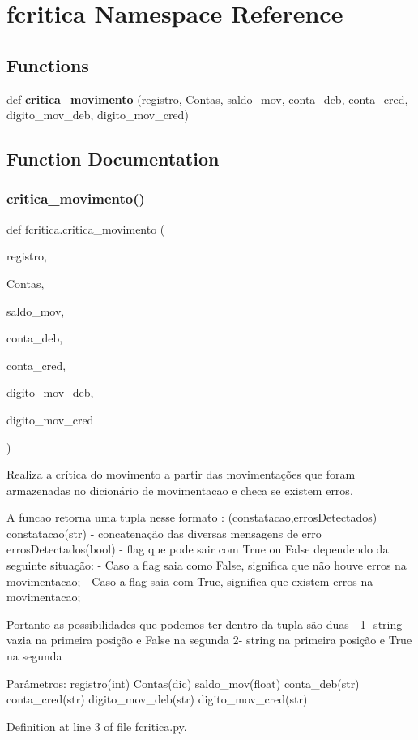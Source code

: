 \section{fcritica Namespace Reference}
\label{namespacefcritica}
\subsection*{Functions}
\begin{DoxyCompactItemize}
\item 
def \textbf{ critica\+\_\+movimento} (registro, Contas, saldo\+\_\+mov, conta\+\_\+deb, conta\+\_\+cred, digito\+\_\+mov\+\_\+deb, digito\+\_\+mov\+\_\+cred)
\end{DoxyCompactItemize}


\subsection{Function Documentation}
\mbox{\label{namespacefcritica_a964cf08203c12f5247facd77732b2154}} 
\subsubsection{critica\_movimento()}
{\footnotesize\ttfamily def fcritica.\+critica\+\_\+movimento (\begin{DoxyParamCaption}\item[{}]{registro,  }\item[{}]{Contas,  }\item[{}]{saldo\+\_\+mov,  }\item[{}]{conta\+\_\+deb,  }\item[{}]{conta\+\_\+cred,  }\item[{}]{digito\+\_\+mov\+\_\+deb,  }\item[{}]{digito\+\_\+mov\+\_\+cred }\end{DoxyParamCaption})}

\begin{DoxyVerb}Realiza a crítica do movimento a partir das movimentações que foram armazenadas
no dicionário de movimentacao e checa se existem erros.

A funcao retorna uma tupla nesse formato : (constatacao,errosDetectados)
constatacao(str) - concatenação das diversas mensagens de erro
errosDetectados(bool) - flag que pode sair com True ou False dependendo
da seguinte situação:
- Caso a flag saia como False, significa que não houve erros na movimentacao;
- Caso a flag saia com True, significa que existem erros na movimentacao;

Portanto as possibilidades que podemos ter dentro da tupla são duas -
1- string vazia na primeira posição e False na segunda
2- string na primeira posição e True na segunda

Parâmetros:
registro(int)
Contas(dic)
saldo_mov(float)
conta_deb(str)
conta_cred(str)
digito_mov_deb(str)
digito_mov_cred(str)
\end{DoxyVerb}
 

Definition at line 3 of file fcritica.\+py.


